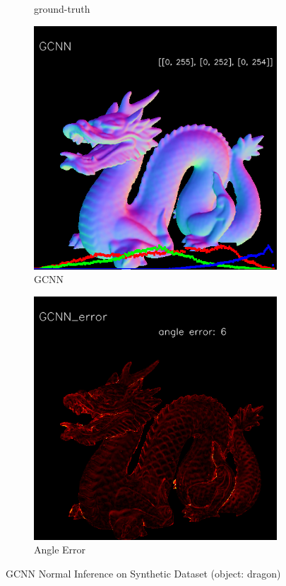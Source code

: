 \begin{figure}[h!]
\begin{subfigure}[b]{0.24\linewidth}
		\caption{ground-truth}
	\end{subfigure}
	\begin{subfigure}[b]{0.24\linewidth}
		\includegraphics[width=\linewidth]{./Figures/gcnn-synthetic/fancy_eval_3_normal_GCNN.png}
		\caption{GCNN}
	\end{subfigure}
	\begin{subfigure}[b]{0.24\linewidth}
		\includegraphics[width=\linewidth]{./Figures/gcnn-synthetic/fancy_eval_3_error_GCNN.png}
		\caption{Angle Error}
	\end{subfigure}
	\caption{GCNN Normal Inference on Synthetic Dataset (object: dragon)}
	\label{fig:gcnn-eval-synthetic}
\end{figure}


